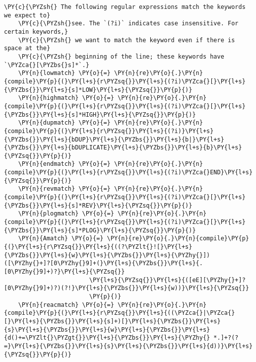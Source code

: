 \begin{Verbatim}[commandchars=\\\{\}]
    \PY{c}{\PYZsh{} The following regular expressions match the keywords we expect to}
    \PY{c}{\PYZsh{}see. The `(?i)` indicates case insensitive. For certain keywords,}
    \PY{c}{\PYZsh{} we want to match the keyword even if there is space at the}
    \PY{c}{\PYZsh{} beginning of the line; these keywords have `\PYZca{}[\PYZbs{}s]*`.}
    \PY{n}{lowmatch} \PY{o}{=} \PY{n}{re}\PY{o}{.}\PY{n}{compile}\PY{p}{(}\PY{l+s}{r\PYZsq{}}\PY{l+s}{(?i)\PYZca{}[}\PY{l+s}{\PYZbs{}}\PY{l+s}{s]*LOW}\PY{l+s}{\PYZsq{}}\PY{p}{)}
    \PY{n}{highmatch} \PY{o}{=} \PY{n}{re}\PY{o}{.}\PY{n}{compile}\PY{p}{(}\PY{l+s}{r\PYZsq{}}\PY{l+s}{(?i)\PYZca{}[}\PY{l+s}{\PYZbs{}}\PY{l+s}{s]*HIGH}\PY{l+s}{\PYZsq{}}\PY{p}{)}
    \PY{n}{dupmatch} \PY{o}{=} \PY{n}{re}\PY{o}{.}\PY{n}{compile}\PY{p}{(}\PY{l+s}{r\PYZsq{}}\PY{l+s}{(?i)}\PY{l+s}{\PYZbs{}}\PY{l+s}{bDUP}\PY{l+s}{\PYZbs{}}\PY{l+s}{b|}\PY{l+s}{\PYZbs{}}\PY{l+s}{bDUPLICATE}\PY{l+s}{\PYZbs{}}\PY{l+s}{b}\PY{l+s}{\PYZsq{}}\PY{p}{)}
    \PY{n}{endmatch} \PY{o}{=} \PY{n}{re}\PY{o}{.}\PY{n}{compile}\PY{p}{(}\PY{l+s}{r\PYZsq{}}\PY{l+s}{(?i)\PYZca{}END}\PY{l+s}{\PYZsq{}}\PY{p}{)}
    \PY{n}{revmatch} \PY{o}{=} \PY{n}{re}\PY{o}{.}\PY{n}{compile}\PY{p}{(}\PY{l+s}{r\PYZsq{}}\PY{l+s}{(?i)\PYZca{}[}\PY{l+s}{\PYZbs{}}\PY{l+s}{s]*REV}\PY{l+s}{\PYZsq{}}\PY{p}{)}
    \PY{n}{plogmatch} \PY{o}{=} \PY{n}{re}\PY{o}{.}\PY{n}{compile}\PY{p}{(}\PY{l+s}{r\PYZsq{}}\PY{l+s}{(?i)\PYZca{}[}\PY{l+s}{\PYZbs{}}\PY{l+s}{s]*PLOG}\PY{l+s}{\PYZsq{}}\PY{p}{)}
    \PY{n}{Amatch} \PY{o}{=} \PY{n}{re}\PY{o}{.}\PY{n}{compile}\PY{p}{(}\PY{l+s}{r\PYZsq{}}\PY{l+s}{((?\PYZlt{}![}\PY{l+s}{\PYZbs{}}\PY{l+s}{w}\PY{l+s}{\PYZbs{}}\PY{l+s}{\PYZhy{}])([\PYZhy{}+]?[0\PYZhy{}9]+(}\PY{l+s}{\PYZbs{}}\PY{l+s}{.[0\PYZhy{}9]+)?}\PY{l+s}{\PYZsq{}}
                        \PY{l+s}{\PYZsq{}}\PY{l+s}{([eE][\PYZhy{}+]?[0\PYZhy{}9]+)?)(?!}\PY{l+s}{\PYZbs{}}\PY{l+s}{w))}\PY{l+s}{\PYZsq{}}
                        \PY{p}{)}
    \PY{n}{reacmatch} \PY{o}{=} \PY{n}{re}\PY{o}{.}\PY{n}{compile}\PY{p}{(}\PY{l+s}{r\PYZsq{}}\PY{l+s}{((\PYZca{}|\PYZca{}[}\PY{l+s}{\PYZbs{}}\PY{l+s}{s]+)[}\PY{l+s}{\PYZbs{}}\PY{l+s}{s}\PY{l+s}{\PYZbs{}}\PY{l+s}{w}\PY{l+s}{\PYZbs{}}\PY{l+s}{d()+=\PYZlt{}\PYZgt{}}\PY{l+s}{\PYZbs{}}\PY{l+s}{\PYZhy{} *.]+?(?=}\PY{l+s}{\PYZbs{}}\PY{l+s}{s}\PY{l+s}{\PYZbs{}}\PY{l+s}{d))}\PY{l+s}{\PYZsq{}}\PY{p}{)}


\end{Verbatim}
